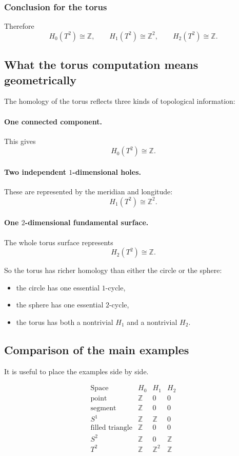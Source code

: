 \documentclass[12pt,a4paper]{article}
\theoremstyle{notespace}
\begin{document}
\subsubsection{Conclusion for the torus}

Therefore
\[
H_0(T^2)\cong \mathbb{Z},
\qquad
H_1(T^2)\cong \mathbb{Z}^2,
\qquad
H_2(T^2)\cong \mathbb{Z}.
\]

\subsection{What the torus computation means geometrically}

The homology of the torus reflects three kinds of topological information:

\paragraph{One connected component.}
This gives
\[
H_0(T^2)\cong \mathbb{Z}.
\]

\paragraph{Two independent \(1\)-dimensional holes.}
These are represented by the meridian and longitude:
\[
H_1(T^2)\cong \mathbb{Z}^2.
\]

\paragraph{One \(2\)-dimensional fundamental surface.}
The whole torus surface represents
\[
H_2(T^2)\cong \mathbb{Z}.
\]

So the torus has richer homology than either the circle or the sphere:
\begin{itemize}
	\item the circle has one essential \(1\)-cycle,
	\item the sphere has one essential \(2\)-cycle,
	\item the torus has both a nontrivial \(H_1\) and a nontrivial \(H_2\).
\end{itemize}

\subsection{Comparison of the main examples}

It is useful to place the examples side by side.

\[
\begin{array}{c|c|c|c}
	\text{Space} & H_0 & H_1 & H_2 \\ \hline
	\text{point} & \mathbb{Z} & 0 & 0 \\
	\text{segment} & \mathbb{Z} & 0 & 0 \\
	S^1 & \mathbb{Z} & \mathbb{Z} & 0 \\
	\text{filled triangle} & \mathbb{Z} & 0 & 0 \\
	S^2 & \mathbb{Z} & 0 & \mathbb{Z} \\
	T^2 & \mathbb{Z} & \mathbb{Z}^2 & \mathbb{Z}
\end{array}
\]
\end{document}
